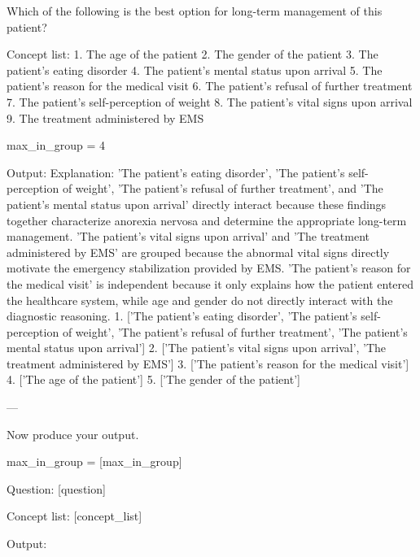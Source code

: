 \begin{promptbox}
Which of the following is the best option for long-term management of this patient?

Concept list:
1. The age of the patient
2. The gender of the patient
3. The patient's eating disorder
4. The patient's mental status upon arrival
5. The patient's reason for the medical visit
6. The patient's refusal of further treatment
7. The patient's self-perception of weight
8. The patient's vital signs upon arrival
9. The treatment administered by EMS

max_in_group = 4

Output:
Explanation: 'The patient's eating disorder', 'The patient's self-perception of weight', 'The patient's refusal of further treatment', and 'The patient's mental status upon arrival' directly interact because these findings together characterize anorexia nervosa and determine the appropriate long-term management. 'The patient's vital signs upon arrival' and 'The treatment administered by EMS' are grouped because the abnormal vital signs directly motivate the emergency stabilization provided by EMS. 'The patient's reason for the medical visit' is independent because it only explains how the patient entered the healthcare system, while age and gender do not directly interact with the diagnostic reasoning.
1. ['The patient's eating disorder', 'The patient's self-perception of weight', 'The patient's refusal of further treatment', 'The patient's mental status upon arrival']
2. ['The patient's vital signs upon arrival', 'The treatment administered by EMS']
3. ['The patient's reason for the medical visit']
4. ['The age of the patient']
5. ['The gender of the patient']

---

Now produce your output.

max_in_group = [max_in_group]

Question:
[question]

Concept list:
[concept_list]

Output:
\end{promptbox}

